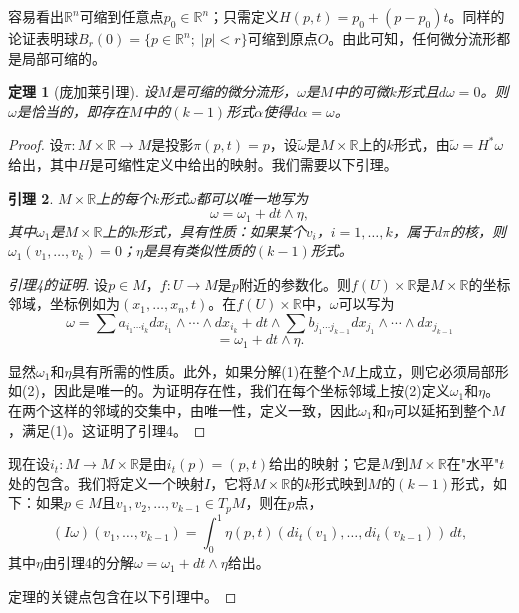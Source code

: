 \documentclass[12pt,a4paper]{ctexbook}
\newtheorem{theorem}{定理}[chapter]
\newtheorem{lemma}[theorem]{引理}
\begin{document}
容易看出$\mathbb{R}^n$可缩到任意点$p_0\in\mathbb{R}^n$；只需定义$H(p,t) = p_0 + (p-p_0)t$。同样的论证表明球$B_r(0) = \{p\in\mathbb{R}^n;\; |p|<r\}$可缩到原点$O$。由此可知，任何微分流形都是局部可缩的。

\begin{theorem}[庞加莱引理]
设$M$是可缩的微分流形，$\omega$是$M$中的可微$k$形式且$d\omega=0$。则$\omega$是恰当的，即存在$M$中的$(k-1)$形式$\alpha$使得$d\alpha = \omega$。
\end{theorem}

\begin{proof}
设$\pi:M\times\mathbb{R}\to M$是投影$\pi(p,t)=p$，设$\tilde{\omega}$是$M\times\mathbb{R}$上的$k$形式，由$\tilde{\omega} = H^*\omega$给出，其中$H$是可缩性定义中给出的映射。我们需要以下引理。

\begin{lemma}
$M\times\mathbb{R}$上的每个$k$形式$\omega$都可以唯一地写为
$$\omega = \omega_1 + dt\wedge \eta, \tag{1}$$
其中$\omega_1$是$M\times\mathbb{R}$上的$k$形式，具有性质：如果某个$v_i$，$i=1,\ldots,k$，属于$d\pi$的核，则$\omega_1(v_1,\ldots,v_k)=0$；$\eta$是具有类似性质的$(k-1)$形式。
\end{lemma}

\begin{proof}[引理4的证明]
设$p\in M$，$f:U\to M$是$p$附近的参数化。则$f(U)\times\mathbb{R}$是$M\times\mathbb{R}$的坐标邻域，坐标例如为$(x_1,\ldots,x_n,t)$。在$f(U)\times\mathbb{R}$中，$\omega$可以写为
$$\omega = \sum a_{i_1\cdots i_k} dx_{i_1}\wedge\cdots\wedge dx_{i_k} + dt\wedge \sum b_{j_1\cdots j_{k-1}} dx_{j_1}\wedge\cdots\wedge dx_{j_{k-1}} \tag{2}$$
$$= \omega_1 + dt\wedge \eta.$$

显然$\omega_1$和$\eta$具有所需的性质。此外，如果分解(1)在整个$M$上成立，则它必须局部形如(2)，因此是唯一的。为证明存在性，我们在每个坐标邻域上按(2)定义$\omega_1$和$\eta$。在两个这样的邻域的交集中，由唯一性，定义一致，因此$\omega_1$和$\eta$可以延拓到整个$M$，满足(1)。这证明了引理4。
\end{proof}

现在设$i_t:M\to M\times\mathbb{R}$是由$i_t(p)=(p,t)$给出的映射；它是$M$到$M\times\mathbb{R}$在"水平"$t$处的包含。我们将定义一个映射$I$，它将$M\times\mathbb{R}$的$k$形式映到$M$的$(k-1)$形式，如下：如果$p\in M$且$v_1,v_2,\ldots,v_{k-1}\in T_pM$，则在$p$点，
$$(I\omega)(v_1,\ldots,v_{k-1}) = \int_0^1 \eta(p,t)(di_t(v_1),\ldots,di_t(v_{k-1}))\,dt,$$
其中$\eta$由引理4的分解$\omega = \omega_1 + dt\wedge\eta$给出。

定理的关键点包含在以下引理中。


\end{proof}
\end{document}
